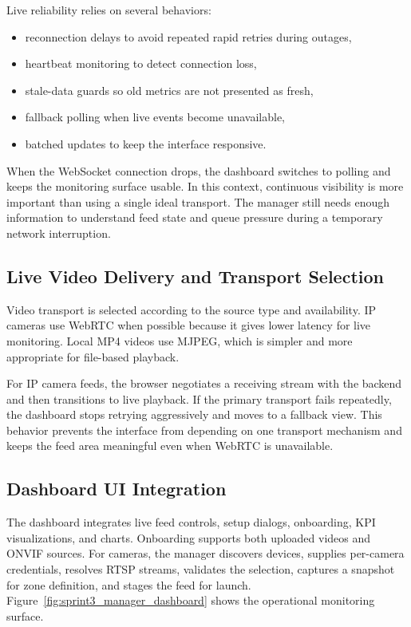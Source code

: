 Live reliability relies on several behaviors:
\begin{itemize}
    \item reconnection delays to avoid repeated rapid retries during outages,
    \item heartbeat monitoring to detect connection loss,
    \item stale-data guards so old metrics are not presented as fresh,
    \item fallback polling when live events become unavailable,
    \item batched updates to keep the interface responsive.
\end{itemize}

When the WebSocket connection drops, the dashboard switches to polling and keeps the monitoring surface usable. In this context, continuous visibility is more important than using a single ideal transport. The manager still needs enough information to understand feed state and queue pressure during a temporary network interruption.

\subsection{Live Video Delivery and Transport Selection}
Video transport is selected according to the source type and availability. IP cameras use WebRTC when possible because it gives lower latency for live monitoring. Local MP4 videos use MJPEG, which is simpler and more appropriate for file-based playback.

For IP camera feeds, the browser negotiates a receiving stream with the backend and then transitions to live playback. If the primary transport fails repeatedly, the dashboard stops retrying aggressively and moves to a fallback view. This behavior prevents the interface from depending on one transport mechanism and keeps the feed area meaningful even when WebRTC is unavailable.

\subsection{Dashboard UI Integration}
The dashboard integrates live feed controls, setup dialogs, onboarding, KPI visualizations, and charts. Onboarding supports both uploaded videos and ONVIF sources. For cameras, the manager discovers devices, supplies per-camera credentials, resolves RTSP streams, validates the selection, captures a snapshot for zone definition, and stages the feed for launch. Figure~\ref{fig:sprint3_manager_dashboard} shows the operational monitoring surface.

